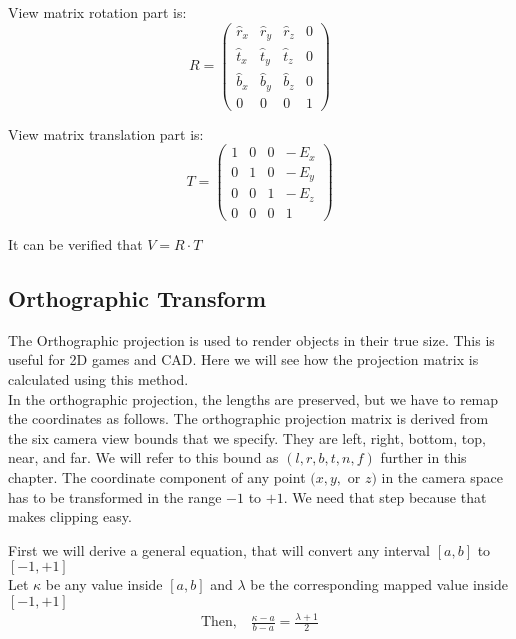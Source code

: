 View matrix rotation part is:
\begin{equation}
R =
\begin{pmatrix}
\hat{r}_x & \hat{r}_y & \hat{r}_z & 0 \\
\hat{t}_x & \hat{t}_y & \hat{t}_z & 0 \\
\hat{b}_x & \hat{b}_y & \hat{b}_z & 0 \\
0         & 0         & 0         & 1
\end{pmatrix}
\end{equation}

View matrix translation part is:
\begin{equation}
T =
\begin{pmatrix}
1 & 0 & 0 & -\,E_x \\
0 & 1 & 0 & -\,E_y \\
0 & 0 & 1 & -\,E_z  \\
0 & 0 & 0 & 1
\end{pmatrix}
\end{equation}

It can be verified that $V = R \cdot T$


\subsection{Orthographic Transform}
The Orthographic projection is used to render objects in their true size. This is useful for 2D games and CAD.
Here we will see how the projection matrix is calculated using this method.\\
In the orthographic projection, the lengths are preserved, but we have to remap the coordinates as follows.
The orthographic projection matrix is derived from the six camera view bounds that we specify. They are left, right, bottom, top, near, and far. We will refer to this bound as $(l, r, b, t, n, f)$ further in this chapter. The coordinate component of any point $(x, y,$ or $z)$ in the camera space has to be transformed in the range $-1$ to $+1$. We need that step because that makes clipping easy.

First we will derive a general equation, that will convert any interval $[a,b]$ to $[-1,+1]$\\
Let $\kappa$ be any value inside $[a,b]$ and $\lambda$ be the corresponding mapped value inside $[-1,+1]$\\
\begin{align*}
\text{Then,}\quad \frac{\kappa-a}{b-a} = \frac{\lambda+1}{2}
\end{align*}


